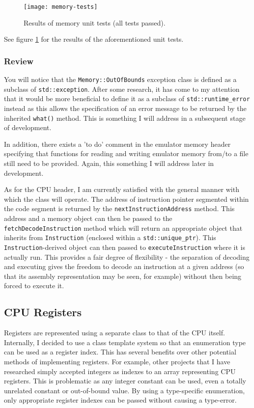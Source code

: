         \inputminted{c++}{code/testmemory.cpp}

        \begin{figure}[h]
            \centering
            \texttt{[image: memory-tests]}
            \caption{Results of memory unit tests (all tests passed).}
            \label{fig:memory-tests}
        \end{figure}

        See figure \ref{fig:memory-tests} for the results of the aforementioned unit tests.

    \subsubsection{Review}
        You will notice that the \texttt{Memory::OutOfBounds} exception class is defined as a subclass of \texttt{std::exception}. After some research, it has come to my attention that it would be more beneficial to define it as a subclass of \texttt{std::runtime\_error} instead as this allows the specification of an error message to be returned by the inherited \texttt{what()} method. This is something I will address in a subsequent stage of development.

        In addition, there exists a 'to do' comment in the emulator memory header specifying that functions for reading and writing emulator memory from/to a file still need to be provided. Again, this something I will address later in development.

        As for the CPU header, I am currently satisfied with the general manner with which the class will operate. The address of instruction pointer segmented within the code segment is returned by the \texttt{nextInstructionAddress} method. This address and a memory object can then be passed to the \texttt{fetchDecodeInstruction} method which will return an appropriate object that inherits from \texttt{Instruction} (enclosed within a \texttt{std::unique\_ptr}). This \texttt{Instruction}-derived object can then passed to \texttt{executeInstruction} where it is actually run. This provides a fair degree of flexibility - the separation of decoding and executing gives the freedom to decode an instruction at a given address (so that its assembly representation may be seen, for example) without then being forced to execute it.

\subsection{CPU Registers}
    Registers are represented using a separate class to that of the CPU itself. Internally, I decided to use a class template system so that an enumeration type can be used as a register index. This has several benefits over other potential methods of implementing registers. For example, other projects that I have researched simply accepted integers as indexes to an array representing CPU registers. This is problematic as any integer constant can be used, even a totally unrelated constant or out-of-bound value. By using a type-specific enumeration, only appropriate register indexes can be passed without causing a type-error.

